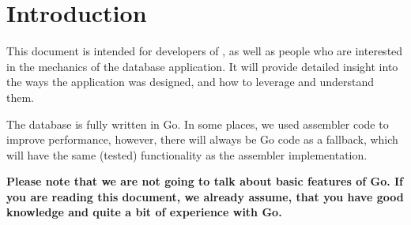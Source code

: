\section{Introduction}
This document is intended for developers of \add{}, as well as people who are interested in the mechanics of the database application.
It will provide detailed insight into the ways the application was designed, and how to leverage and understand them.

The database is fully written in Go.
In some places, we used assembler code to improve performance, however, there will always be Go code as a fallback, which will have the same (tested) functionality as the assembler implementation.

\textbf{Please note that we are not going to talk about basic features of Go. If you are reading this document, we already assume, that you have good knowledge and quite a bit of experience with Go.}